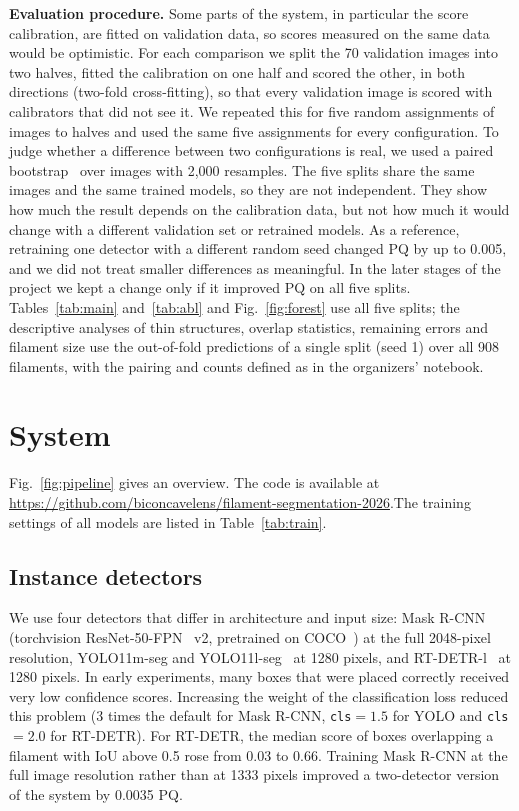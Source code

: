 \documentclass[conference]{IEEEtran}
\begin{document}
\textbf{Evaluation procedure.} Some parts of the system, in particular the score calibration, are fitted on validation data, so scores measured on the same data would be optimistic. For each comparison we split the 70 validation images into two halves, fitted the calibration on one half and scored the other, in both directions (two-fold cross-fitting), so that every validation image is scored with calibrators that did not see it. We repeated this for five random assignments of images to halves and used the same five assignments for every configuration. To judge whether a difference between two configurations is real, we used a paired bootstrap~\cite{efron1979bootstrap} over images with 2,000 resamples. The five splits share the same images and the same trained models, so they are not independent. They show how much the result depends on the calibration data, but not how much it would change with a different validation set or retrained models. As a reference, retraining one detector with a different random seed changed PQ by up to 0.005, and we did not treat smaller differences as meaningful. In the later stages of the project we kept a change only if it improved PQ on all five splits. Tables~\ref{tab:main} and~\ref{tab:abl} and Fig.~\ref{fig:forest} use all five splits; the descriptive analyses of thin structures, overlap statistics, remaining errors and filament size use the out-of-fold predictions of a single split (seed 1) over all 908 filaments, with the pairing and counts defined as in the organizers' notebook.

\section{System}
\label{sec:system}
Fig.~\ref{fig:pipeline} gives an overview. The code is available at \url{https://github.com/biconcavelens/filament-segmentation-2026}.The training settings of all models are listed in Table~\ref{tab:train}.

\subsection{Instance detectors}
We use four detectors that differ in architecture and input size: Mask R-CNN~\cite{he2017maskrcnn} (torchvision ResNet-50-FPN~\cite{lin2017fpn} v2, pretrained on COCO~\cite{lin2014coco}) at the full 2048-pixel resolution, YOLO11m-seg and YOLO11l-seg~\cite{jocher2024yolo11} at 1280 pixels, and RT-DETR-l~\cite{zhao2024rtdetr} at 1280 pixels. In early experiments, many boxes that were placed correctly received very low confidence scores. Increasing the weight of the classification loss reduced this problem (3 times the default for Mask R-CNN, \texttt{cls}$=1.5$ for YOLO and \texttt{cls}$=2.0$ for RT-DETR). For RT-DETR, the median score of boxes overlapping a filament with IoU above 0.5 rose from 0.03 to 0.66. Training Mask R-CNN at the full image resolution rather than at 1333 pixels improved a two-detector version of the system by 0.0035 PQ.
\end{document}
